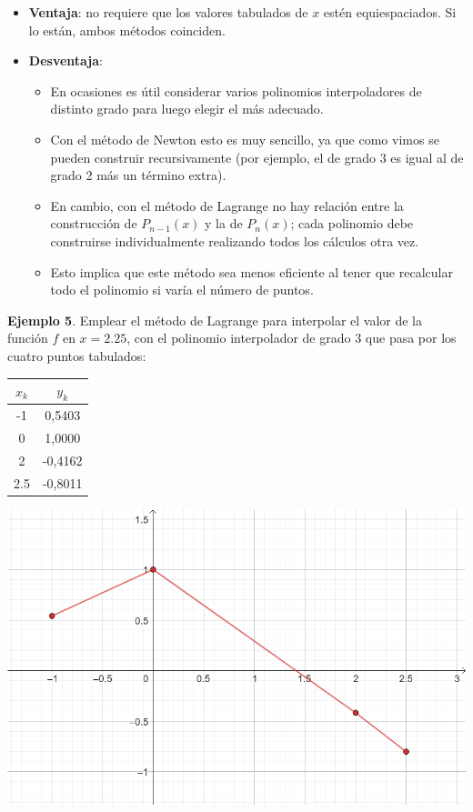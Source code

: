 \documentclass[openany]{book}
\providecommand{\tightlist}{%
  \setlength{\itemsep}{0pt}\setlength{\parskip}{0pt}}
\begin{document}
\begin{itemize}
\item
  \textbf{Ventaja}: no requiere que los valores tabulados de \(x\) estén equiespaciados. Si lo están, ambos métodos coinciden.
\item
  \textbf{Desventaja}:

  \begin{itemize}
  \tightlist
  \item
    En ocasiones es útil considerar varios polinomios interpoladores de distinto grado para luego elegir el más adecuado.
  \item
    Con el método de Newton esto es muy sencillo, ya que como vimos se pueden construir recursivamente (por ejemplo, el de grado 3 es igual al de grado 2 más un término extra).
  \item
    En cambio, con el método de Lagrange no hay relación entre la construcción de \(P_{n-1}(x)\) y la de \(P_n(x)\); cada polinomio debe construirse individualmente realizando todos los cálculos otra vez.
  \item
    Esto implica que este método sea menos eficiente al tener que recalcular todo el polinomio si varía el número de puntos.
  \end{itemize}
\end{itemize}

\textbf{Ejemplo 5}. Emplear el método de Lagrange para interpolar el valor de la función \(f\) en \(x=2.25\), con el polinomio interpolador de grado 3 que pasa por los cuatro puntos tabulados:

\begin{longtable}[]{@{}cc@{}}
\toprule
\(x_k\) & \(y_k\)\tabularnewline
\midrule
\endhead
-1 & 0,5403\tabularnewline
0 & 1,0000\tabularnewline
2 & -0,4162\tabularnewline
2.5 & -0,8011\tabularnewline
\bottomrule
\end{longtable}

\begin{center}\includegraphics[width=1\linewidth]{Plots/U4/lagrej1} \end{center}
\end{document}
